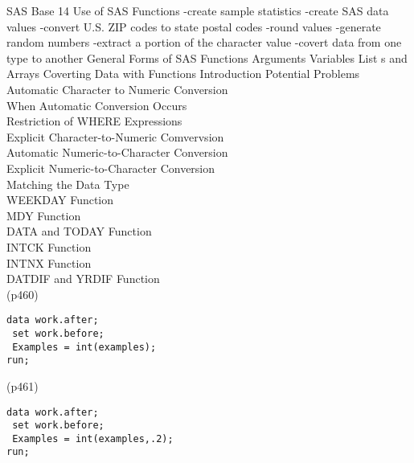 SAS Base 14
Use of SAS Functions
-create sample statistics
-create SAS data values
-convert U.S. ZIP codes to state postal codes
-round values
-generate random numbers
-extract a portion of the character value
-covert data from one type to another
General Forms of SAS Functions
Arguments Variables List s and Arrays
Coverting Data with Functions
Introduction
Potential Problems
Automatic Character to Numeric Conversion\\
When Automatic Conversion Occurs\\
Restriction of WHERE Expressions\\
Explicit Character-to-Numeric Comvervsion\\
Automatic Numeric-to-Character Conversion\\
Explicit Numeric-to-Character Conversion\\
Matching the Data Type\\
WEEKDAY Function\\
MDY Function\\
DATA and TODAY Function\\
INTCK Function\\
INTNX Function\\
DATDIF and YRDIF Function\\
(p460)
\begin{framed}
\begin{verbatim}
data work.after;
 set work.before;
 Examples = int(examples);
run;
\end{verbatim}
\end{framed}

(p461)

\begin{framed}
\begin{verbatim}
data work.after;
 set work.before;
 Examples = int(examples,.2);
run;
\end{verbatim}
\end{framed}
